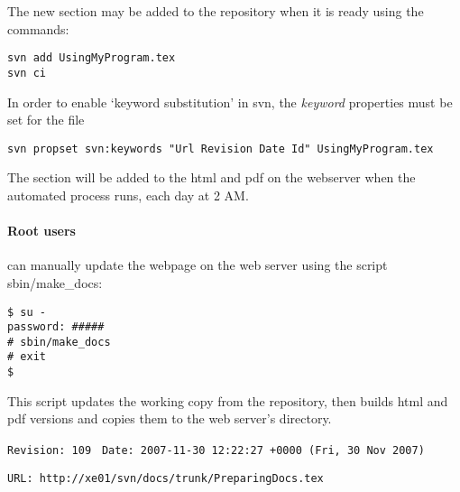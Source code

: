 The new section may be added to the repository when it is ready using the commands:
\begin{verbatim}
svn add UsingMyProgram.tex
svn ci 
\end{verbatim}

In order to enable `keyword substitution' in svn, the \textit{keyword} properties must be set for the file
\begin{verbatim}
svn propset svn:keywords "Url Revision Date Id" UsingMyProgram.tex
\end{verbatim}


The section will be added to the html and pdf on the webserver when
the automated process runs, each day at 2 AM.
\paragraph{Root users} can manually update the webpage on the web server 
using the script sbin/make\_docs:
\begin{verbatim}
$ su -
password: #####
# sbin/make_docs
# exit
$
\end{verbatim}
This script updates the working copy from the repository, then builds 
html and pdf versions and copies them to the web server's directory.


\vfill{}
\verb$Revision: 109 $
\verb$Date: 2007-11-30 12:22:27 +0000 (Fri, 30 Nov 2007) $


\verb$URL: http://xe01/svn/docs/trunk/PreparingDocs.tex $

